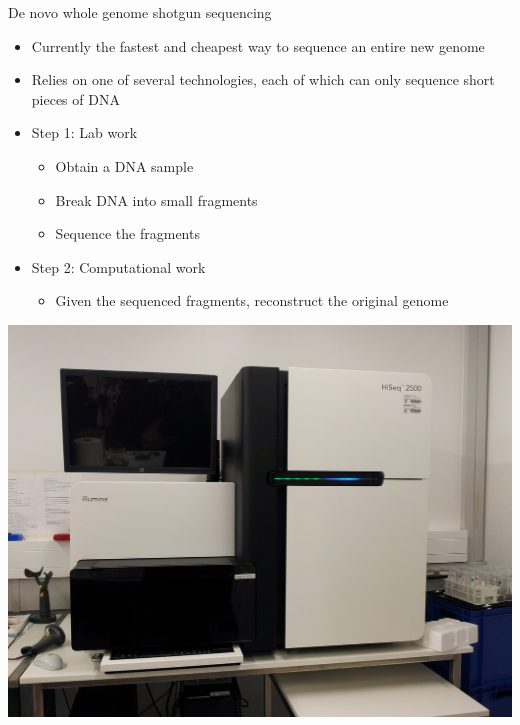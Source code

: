 \documentclass[xcolor=dvipsnames]{beamer}
\begin{document}
\begin{frame}{De novo whole genome shotgun sequencing}
    \begin{minipage}{0.66\textwidth}
        \begin{itemize}
            \item Currently the fastest and cheapest way to sequence an entire
                  new genome
            \item Relies on one of several technologies, each of which can only
                sequence short pieces of DNA
            \item Step 1: Lab work
                \begin{itemize}
                    \item Obtain a DNA sample
                    \item Break DNA into small fragments
                    \item Sequence the fragments
                \end{itemize}
            \item Step 2: Computational work
                \begin{itemize}
                    \item Given the sequenced fragments, reconstruct the original genome
                \end{itemize}
        \end{itemize}
    \end{minipage}
    \begin{minipage}{0.32\textwidth}
        \begin{center}
            \includegraphics[width=1.0\textwidth]{Illumina_HiSeq_2500.jpg} \\

\end{center}
\end{minipage}
\end{frame}
\end{document}
